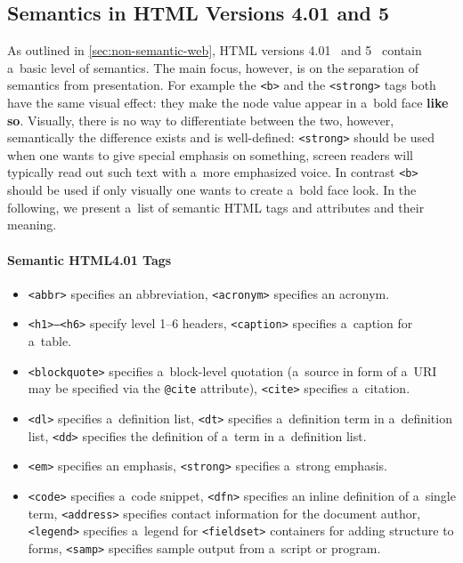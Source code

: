 \subsection{Semantics in HTML Versions 4.01 and 5}
As outlined in \autoref{sec:non-semantic-web},
HTML versions 4.01~\cite{raggett1999html}
and 5~\cite{berjon2012html5}
contain a~basic level of semantics.
The main focus, however, is on the separation of semantics
from presentation.
For example the \texttt{<b>} and the \texttt{<strong>} tags
both have the same visual effect:
they make the node value appear in a~bold face \textbf{like so}.
Visually, there is no way to differentiate between the two,
however, semantically the difference exists and is well-defined:
\texttt{<strong>} should be used when
one wants to give special emphasis on something,
screen readers will typically read out such text
with a~more emphasized voice.
In contrast \texttt{<b>} should be used
if only visually one wants to create a~bold face look.
In the following, we present a~list of semantic HTML tags
and attributes and their meaning.

\paragraph{Semantic HTML4.01 Tags}

\begin{itemize}
  \item \texttt{<abbr>} specifies an abbreviation,
        \texttt{<acronym>} specifies an acronym.
  \item \texttt{<h1>--<h6>} specify level 1--6 headers,
        \texttt{<caption>} specifies a~caption for a~table.
  \item \texttt{<blockquote>} specifies a~block-level quotation
        (a~source in form of a~URI may be specified via the
        \texttt{@cite} attribute),
        \texttt{<cite>} specifies a~citation.
  \item \texttt{<dl>} specifies a~definition list, \texttt{<dt>}
        specifies a~definition term in a~definition list,
        \texttt{<dd>} specifies the definition of a~term
        in a~definition list.
  \item \texttt{<em>} specifies an emphasis, \texttt{<strong>}
        specifies a~strong emphasis.
  \item \texttt{<code>} specifies a~code snippet, \texttt{<dfn>}
        specifies an inline definition of a~single term,
        \texttt{<address>} specifies contact information
        for the document author, \texttt{<legend>} specifies
        a~legend for \texttt{<fieldset>} containers
        for adding structure to forms,
        \texttt{<samp>} specifies sample output
        from a~script or program.
\end{itemize}

